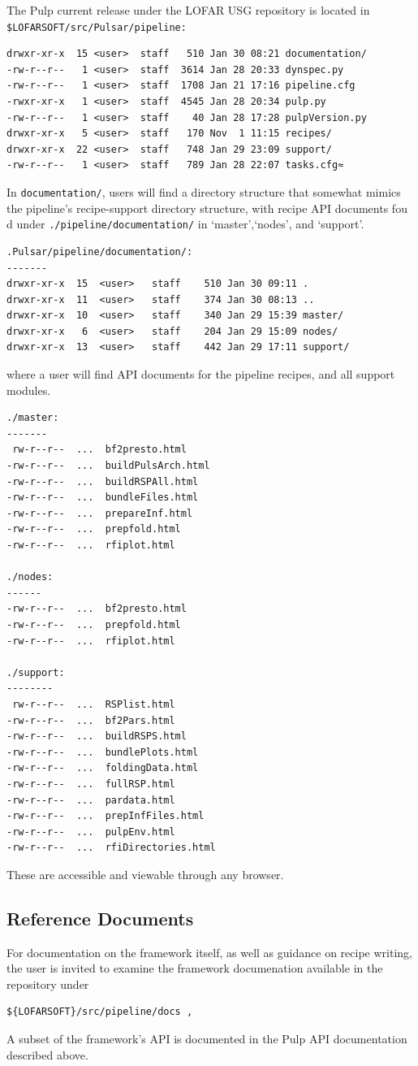 \documentclass[a4paper,10pt,bibtotoc]{scrartcl}
\begin{document}
The Pulp current release under the LOFAR USG repository is located in \\
\noindent \verb|$LOFARSOFT/src/Pulsar/pipeline:|
\begin{verbatim}
drwxr-xr-x  15 <user>  staff   510 Jan 30 08:21 documentation/
-rw-r--r--   1 <user>  staff  3614 Jan 28 20:33 dynspec.py
-rw-r--r--   1 <user>  staff  1708 Jan 21 17:16 pipeline.cfg
-rwxr-xr-x   1 <user>  staff  4545 Jan 28 20:34 pulp.py
-rw-r--r--   1 <user>  staff    40 Jan 28 17:28 pulpVersion.py
drwxr-xr-x   5 <user>  staff   170 Nov  1 11:15 recipes/
drwxr-xr-x  22 <user>  staff   748 Jan 29 23:09 support/
-rw-r--r--   1 <user>  staff   789 Jan 28 22:07 tasks.cfg≈
\end{verbatim}
In \verb|documentation/|, users will  find a directory structure that
somewhat mimics the pipeline's recipe-support directory structure, with
recipe API documents fou d under \verb|./pipeline/documentation/| in
`master',`nodes', and `support'.
\begin{verbatim}
.Pulsar/pipeline/documentation/:
-------
drwxr-xr-x  15  <user>   staff    510 Jan 30 09:11 .
drwxr-xr-x  11  <user>   staff    374 Jan 30 08:13 ..
drwxr-xr-x  10  <user>   staff    340 Jan 29 15:39 master/
drwxr-xr-x   6  <user>   staff    204 Jan 29 15:09 nodes/
drwxr-xr-x  13  <user>   staff    442 Jan 29 17:11 support/
\end{verbatim}
where a user will find API documents for the pipeline recipes, and all support
modules.\\
\begin{verbatim}
./master:
-------
 rw-r--r--  ...  bf2presto.html
-rw-r--r--  ...  buildPulsArch.html
-rw-r--r--  ...  buildRSPAll.html
-rw-r--r--  ...  bundleFiles.html
-rw-r--r--  ...  prepareInf.html
-rw-r--r--  ...  prepfold.html
-rw-r--r--  ...  rfiplot.html

./nodes:
------
-rw-r--r--  ...  bf2presto.html
-rw-r--r--  ...  prepfold.html
-rw-r--r--  ...  rfiplot.html

./support:
--------
 rw-r--r--  ...  RSPlist.html
-rw-r--r--  ...  bf2Pars.html
-rw-r--r--  ...  buildRSPS.html
-rw-r--r--  ...  bundlePlots.html
-rw-r--r--  ...  foldingData.html
-rw-r--r--  ...  fullRSP.html
-rw-r--r--  ...  pardata.html
-rw-r--r--  ...  prepInfFiles.html
-rw-r--r--  ...  pulpEnv.html
-rw-r--r--  ...  rfiDirectories.html
\end{verbatim}
These are accessible and viewable through any browser.

\subsection{Reference Documents}
For documentation on the framework itself, as well as guidance on recipe writing,
the user is invited to examine the framework documenation available in the 
repository under
\begin{verbatim}
${LOFARSOFT}/src/pipeline/docs ,
\end{verbatim}
A subset of the framework's API is documented in the Pulp  API
documentation described above.
\end{document}
